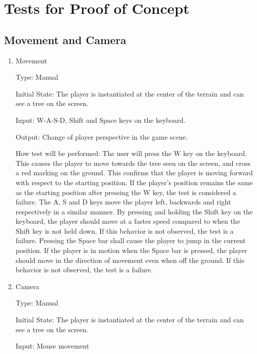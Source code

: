 \documentclass[12pt, titlepage]{article}
\begin{document}
\section{Tests for Proof of Concept}

\subsection{Movement and Camera}
		
\begin{enumerate}

\item{Movement\\}

Type: Manual
					
Initial State: The player is instantiated at the center of the terrain and can see a tree on the screen.
					
Input: W-A-S-D, Shift and Space keys on the keyboard.
					
Output: Change of player perspective in the game scene.
					
How test will be performed:
The user will press the W key on the keyboard. This causes the player to move towards the tree seen on the screen, and cross a red marking on the ground. This confirms that the player is moving forward with respect to the starting position. If the player's position remains the same as the starting position after pressing the W key, the test is considered a failure. The A, S and D keys move the player left, backwards and right respectively in a similar manner.
\newline
By pressing and holding the Shift key on the keyboard, the player should move at a faster speed compared to when the Shift key is not held down. If this behavior is not observed, the test is a failure.\newline
Pressing the Space bar shall cause the player to jump in the current position. If the player is in motion when the Space bar is pressed, the player should move in the direction of movement even when off the ground. If this behavior is not observed, the test is a failure.
					
\item{Camera\\}

Type: Manual
					
Initial State: The player is instantiated at the center of the terrain and can see a tree on the screen.
					
Input: Mouse movement
					

\end{enumerate}
\end{document}
